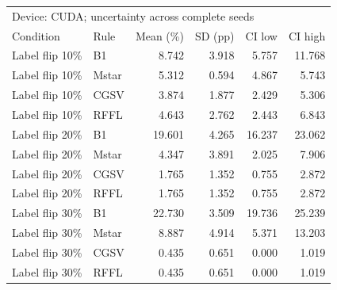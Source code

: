 \begin{tabular}{llrrrr}
\toprule
\multicolumn{6}{l}{Device: CUDA; uncertainty across complete seeds} \\
Condition & Rule & Mean (\%) & SD (pp) & CI low & CI high \\
\midrule
Label flip 10\% & B1 & 8.742 & 3.918 & 5.757 & 11.768 \\
Label flip 10\% & Mstar & 5.312 & 0.594 & 4.867 & 5.743 \\
Label flip 10\% & CGSV & 3.874 & 1.877 & 2.429 & 5.306 \\
Label flip 10\% & RFFL & 4.643 & 2.762 & 2.443 & 6.843 \\
Label flip 20\% & B1 & 19.601 & 4.265 & 16.237 & 23.062 \\
Label flip 20\% & Mstar & 4.347 & 3.891 & 2.025 & 7.906 \\
Label flip 20\% & CGSV & 1.765 & 1.352 & 0.755 & 2.872 \\
Label flip 20\% & RFFL & 1.765 & 1.352 & 0.755 & 2.872 \\
Label flip 30\% & B1 & 22.730 & 3.509 & 19.736 & 25.239 \\
Label flip 30\% & Mstar & 8.887 & 4.914 & 5.371 & 13.203 \\
Label flip 30\% & CGSV & 0.435 & 0.651 & 0.000 & 1.019 \\
Label flip 30\% & RFFL & 0.435 & 0.651 & 0.000 & 1.019 \\
\bottomrule
\end{tabular}
